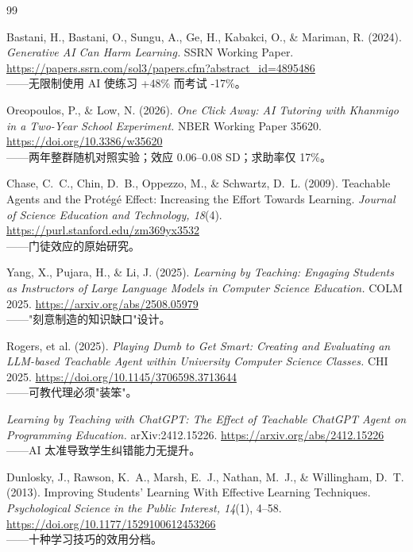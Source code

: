\documentclass[11pt,a4paper,UTF8,fontset=windows]{ctexart}
\begin{document}
\begin{thebibliography}{99}
\small
\setlength{\itemsep}{1pt}
\setlength{\parsep}{0pt}

 Bastani, H., Bastani, O., Sungu, A., Ge, H., Kabakci, O., \& Mariman,
R. (2024). \emph{Generative AI Can Harm Learning.} SSRN Working Paper.
\url{https://papers.ssrn.com/sol3/papers.cfm?abstract_id=4895486}
\\ ——无限制使用 AI 使练习 +48\% 而考试 -17\%。

 Oreopoulos, P., \& Low, N. (2026). \emph{One Click Away: AI Tutoring
with Khanmigo in a Two-Year School Experiment.} NBER Working Paper 35620.
\url{https://doi.org/10.3386/w35620}
\\ ——两年整群随机对照实验；效应 0.06--0.08 SD；求助率仅 17\%。

 Chase, C.~C., Chin, D.~B., Oppezzo, M., \& Schwartz, D.~L. (2009).
Teachable Agents and the Prot\'eg\'e Effect: Increasing the Effort Towards Learning.
\emph{Journal of Science Education and Technology, 18}(4).
\url{https://purl.stanford.edu/zm369yx3532}
\\ ——门徒效应的原始研究。

 Yang, X., Pujara, H., \& Li, J. (2025). \emph{Learning by Teaching:
Engaging Students as Instructors of Large Language Models in Computer Science Education.}
COLM 2025. \url{https://arxiv.org/abs/2508.05979}
\\ ——"刻意制造的知识缺口"设计。

 Rogers, et al. (2025). \emph{Playing Dumb to Get Smart: Creating and
Evaluating an LLM-based Teachable Agent within University Computer Science Classes.} CHI
2025. \url{https://doi.org/10.1145/3706598.3713644}
\\ ——可教代理必须"装笨"。

 \emph{Learning by Teaching with ChatGPT: The Effect of Teachable
ChatGPT Agent on Programming Education.} arXiv:2412.15226.
\url{https://arxiv.org/abs/2412.15226}
\\ ——AI 太准导致学生纠错能力无提升。

 Dunlosky, J., Rawson, K.~A., Marsh, E.~J., Nathan, M.~J., \&
Willingham, D.~T. (2013). Improving Students' Learning With Effective Learning Techniques.
\emph{Psychological Science in the Public Interest, 14}(1), 4--58.
\url{https://doi.org/10.1177/1529100612453266}
\\ ——十种学习技巧的效用分档。


\end{thebibliography}
\end{document}
